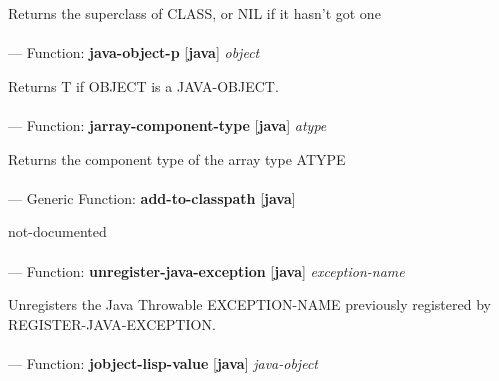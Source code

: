 \begin{adjustwidth}{5em}{5em}
Returns the superclass of CLASS, or NIL if it hasn't got one
\end{adjustwidth}

\paragraph{}
\label{JAVA:JAVA-OBJECT-P}
--- Function: \textbf{java-object-p} [\textbf{java}] \textit{object}

\begin{adjustwidth}{5em}{5em}
Returns T if OBJECT is a JAVA-OBJECT.
\end{adjustwidth}

\paragraph{}
\label{JAVA:JARRAY-COMPONENT-TYPE}
--- Function: \textbf{jarray-component-type} [\textbf{java}] \textit{atype}

\begin{adjustwidth}{5em}{5em}
Returns the component type of the array type ATYPE
\end{adjustwidth}

\paragraph{}
\label{JAVA:ADD-TO-CLASSPATH}
--- Generic Function: \textbf{add-to-classpath} [\textbf{java}] \textit{}

\begin{adjustwidth}{5em}{5em}
not-documented
\end{adjustwidth}

\paragraph{}
\label{JAVA:UNREGISTER-JAVA-EXCEPTION}
--- Function: \textbf{unregister-java-exception} [\textbf{java}] \textit{exception-name}

\begin{adjustwidth}{5em}{5em}
Unregisters the Java Throwable EXCEPTION-NAME previously registered by REGISTER-JAVA-EXCEPTION.
\end{adjustwidth}

\paragraph{}
\label{JAVA:JOBJECT-LISP-VALUE}
--- Function: \textbf{jobject-lisp-value} [\textbf{java}] \textit{java-object}


